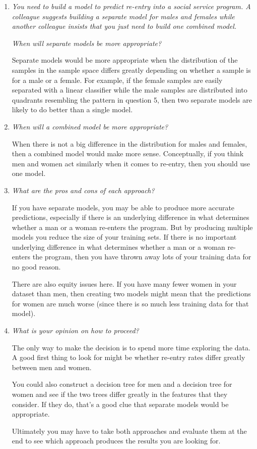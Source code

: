 \documentclass[11pt]{article}
\begin{document}
\begin{enumerate}
    \item \textit{You need to build a model to predict re-entry into a social
        service program. A colleague suggests building a separate model for
        males and females while another colleague insists that you just need to
        build one combined model.}

        \textit{When will separate models be more appropriate?}

        Separate models would be more appropriate when the distribution of the
        samples in the sample space differs greatly depending on whether a
        sample is for a male or a female. For example, if the female samples
        are easily separated with a linear classifier while the male samples
        are distributed into quadrants resembling the pattern in question 5,
        then two separate models are likely to do better than a single model.

    \item \textit{When will a combined model be more appropriate?}

        When there is not a big difference in the distribution for males and
        females, then a combined model would make more sense. Conceptually, if
        you think men and women act similarly when it comes to re-entry, then
        you should use one model.

    \item \textit{What are the pros and cons of each approach?}

        If you have separate models, you may be able to produce more accurate
        predictions, especially if there is an underlying difference in what
        determines whether a man or a woman re-enters the program. But by
        producing multiple models you reduce the size of your training sets. If
        there is no important underlying difference in what determines whether
        a man or a woman re-enters the program, then you have thrown away lots
        of your training data for no good reason.

        There are also equity issues here. If you have many fewer women in your
        dataset than men, then creating two models might mean that the
        predictions for women are much worse (since there is so much less
        training data for that model).

    \item \textit{What is your opinion on how to proceed?}

        The only way to make the decision is to spend more time exploring the
        data. A good first thing to look for might be whether re-entry rates
        differ greatly between men and women.

        You could also construct a decision tree for men and a decision tree
        for women and see if the two trees differ greatly in the features that
        they consider. If they do, that's a good clue that separate models
        would be appropriate.

        Ultimately you may have to take both approaches and evaluate them at
        the end to see which approach produces the results you are looking for.
\end{enumerate}
\end{document}
